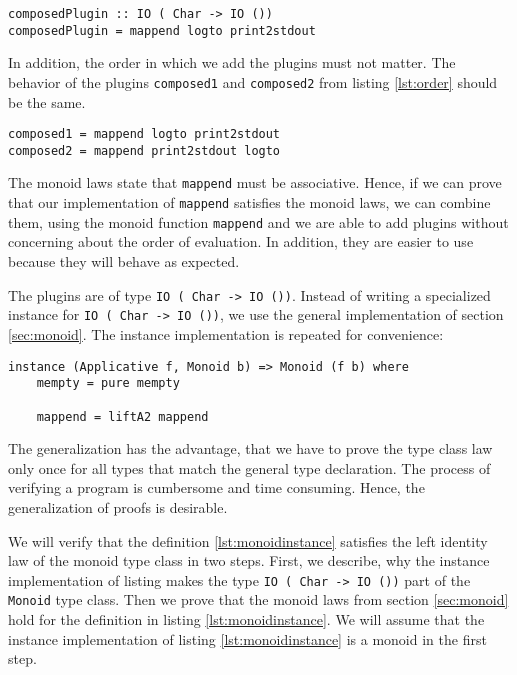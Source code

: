\begin{lstlisting}[caption={Composition of two plugins}, label={lst:composition}]
composedPlugin :: IO ( Char -> IO ())
composedPlugin = mappend logto print2stdout
\end{lstlisting}

In addition, the order in which we add the plugins must not matter. The behavior of the plugins \verb|composed1| and \verb|composed2| from listing \ref{lst:order} should be the same.

\begin{lstlisting}[caption={The order of the plugins must not matter.}, label={lst:order}]
composed1 = mappend logto print2stdout
composed2 = mappend print2stdout logto
\end{lstlisting}

The monoid laws state that \verb|mappend| must be associative. Hence, if we can prove that our implementation of \verb|mappend| satisfies the monoid laws, we can combine them, using the monoid function \verb|mappend| and we are able to add plugins without concerning about the order of evaluation. In addition, they are easier to use because they will behave as expected.

The plugins are of type \verb|IO ( Char -> IO ())|. Instead of writing a specialized instance for \verb|IO ( Char -> IO ())|, we use the general implementation of section \ref{sec:monoid}.
The instance implementation is repeated for convenience:

\begin{lstlisting}[caption={Monoid instance},label={lst:monoidinstance}]
instance (Applicative f, Monoid b) => Monoid (f b) where
    mempty = pure mempty

    mappend = liftA2 mappend
\end{lstlisting}
The generalization has the advantage, that we have to prove the type class law only once for all types that match the general type declaration. The process of verifying a program is cumbersome and time consuming. Hence, the generalization of proofs is desirable.

We will verify that the definition \ref{lst:monoidinstance} satisfies the left identity law of the monoid type class in two steps. First, we describe, why the instance implementation of listing makes the type \verb|IO ( Char -> IO ())| part of the \verb|Monoid| type class. Then we prove that the monoid laws from section \ref{sec:monoid} hold for the definition in listing \ref{lst:monoidinstance}. We will assume that the instance implementation of listing \ref{lst:monoidinstance} is a monoid in the first step.

